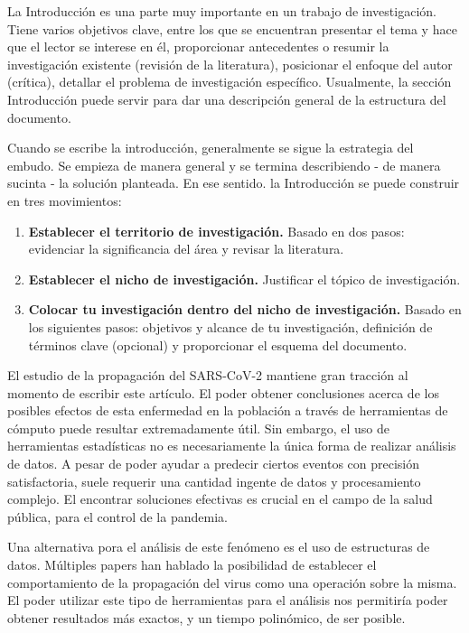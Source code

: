 La Introducción es una parte muy importante en un trabajo de investigación. Tiene varios objetivos clave, entre los que se encuentran presentar el tema y hace que el lector se interese en él, proporcionar antecedentes o resumir la investigación existente (revisión de la literatura), posicionar el enfoque del autor (crítica), detallar el problema de investigación específico. Usualmente, la sección Introducción puede servir para dar una descripción general de la estructura del documento.

Cuando se escribe la introducción, generalmente se sigue la estrategia del embudo. Se empieza de manera general y se termina describiendo - de manera sucinta - la solución planteada. En ese sentido. la Introducción se puede construir en tres movimientos:

\begin{enumerate}
  \item \textbf{Establecer el territorio de investigación.} Basado en dos pasos: evidenciar la significancia del área y revisar la literatura.
  \item \textbf{Establecer el nicho de investigación.} Justificar el tópico de investigación.
  \item \textbf{Colocar tu investigación dentro del nicho de investigación.} Basado en los siguientes pasos: objetivos y alcance de tu investigación, definición de términos clave (opcional) y proporcionar el esquema del documento.
\end{enumerate}

\begin{tcolorbox}[colback=blue!5!white,colframe=blue!75!black,title=Ejemplo Movimiento 1]
  El estudio de la propagación del SARS-CoV-2 mantiene gran tracción al momento de escribir este artículo. El poder obtener conclusiones acerca de los posibles efectos de esta enfermedad en la población a través de herramientas de cómputo puede resultar extremadamente útil. Sin embargo, el uso de herramientas estadísticas no es necesariamente la única forma de realizar análisis de datos. A pesar de poder ayudar a predecir ciertos eventos con precisión satisfactoria, suele requerir una cantidad ingente de datos y procesamiento complejo. El encontrar soluciones efectivas es crucial en el campo de la salud pública, para el control de la pandemia.

  Una alternativa pora el análisis de este fenómeno es el uso de estructuras de datos. Múltiples papers han hablado la posibilidad de establecer el comportamiento de la propagación del virus como una operación sobre la misma. El poder utilizar este tipo de herramientas para el análisis nos permitiría poder obtener resultados más exactos, y un tiempo polinómico, de ser posible.
\end{tcolorbox}


